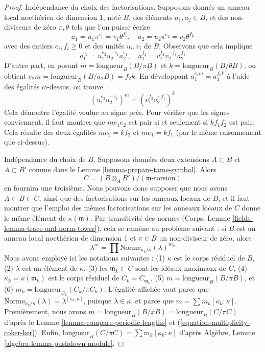 \begin{proof}
Indépendance du choix des factorisations. Supposons donnés
un anneau local noethérien de dimension $1$, noté $B$, des éléments $a_1, a_2 \in B$,
et des non-diviseurs de zéro $\pi, \theta$ tels que l'on puisse écrire
$$
a_1 = u_1 \pi^{e_1} = v_1 \theta^{f_1},\quad
a_2 = u_2 \pi^{e_2} = v_2 \theta^{f_2}
$$
avec des entiers $e_i, f_i \geq 0$ et des unités $u_i, v_i$ de $B$.
Observons que cela implique
$$
a_1^{e_2} = u_1^{e_2}u_2^{-e_1}a_2^{e_1},\quad
a_1^{f_2} = v_1^{f_2}v_2^{-f_1}a_2^{f_1}
$$
D'autre part, en posant
$m = \text{longueur}_B(B/\pi B)$ et $k = \text{longueur}_B(B/\theta B)$,
on obtient $e_2 m = \text{longueur}_B(B/a_2 B) = f_2 k$.
En développant $a_1^{e_2m} = a_1^{f_2 k}$ à l'aide des égalités ci-dessus, on trouve
$$
(u_1^{e_2}u_2^{-e_1})^m =  (v_1^{f_2}v_2^{-f_1})^k
$$
Cela démontre l'égalité voulue au signe près. Pour vérifier que les signes
conviennent, il faut montrer que $me_1e_2$ est pair si et seulement si
$kf_1f_2$ est pair. Cela résulte des deux égalités $me_2 = kf_2$ et
$me_1 = kf_1$ (par le même raisonnement que ci-dessus).

\medskip\noindent
Indépendance du choix de $B$. Supposons données deux extensions
$A \subset B$ et $A \subset B'$ comme dans le Lemme \ref{lemma-prepare-tame-symbol}.
Alors
$$
C = (B \otimes_A B')/(\mathfrak m\text{-torsion})
$$
en fournira une troisième. Nous pouvons donc supposer que nous avons
$A \subset B \subset C$, ainsi que des factorisations sur les
anneaux locaux de $B$, et il faut montrer que l'emploi
des mêmes factorisations sur les anneaux locaux de $C$
donne le même élément de $\kappa(\mathfrak m)$.
Par transitivité des normes
(Corps, Lemme \ref{fields-lemma-trace-and-norm-tower}),
cela se ramène au problème suivant :
si $B$ est un anneau local noethérien de dimension $1$
et $\pi \in B$ un non-diviseur de zéro, alors
$$
\lambda^m = \prod \text{Norme}_{\kappa_k/\kappa}(\lambda)^{m_k}
$$
Nous avons employé ici les notations suivantes :
(1) $\kappa$ est le corps résiduel de $B$,
(2) $\lambda$ est un élément de $\kappa$,
(3) les $\mathfrak m_k \subset C$ sont les idéaux maximaux de $C$,
(4) $\kappa_k = \kappa(\mathfrak m_k)$ est le corps résiduel de
$C_k = C_{\mathfrak m_k}$,
(5) $m = \text{longueur}_B(B/\pi B)$, et
(6) $m_k = \text{longueur}_{C_k}(C_k/\pi C_k)$.
L'égalité affichée vaut parce que
$\text{Norme}_{\kappa_k/\kappa}(\lambda) = \lambda^{[\kappa_k : \kappa]}$,
puisque $\lambda \in \kappa$, et parce que $m = \sum m_k[\kappa_k:\kappa]$.
Premièrement, nous avons $m = \text{longueur}_B(B/xB) = \text{longueur}_B(C/\pi C)$
d'après le Lemme \ref{lemma-compare-periodic-lengths} 
et (\ref{equation-multiplicity-coker-ker}).
Enfin, $\text{longueur}_B(C/\pi C) = \sum m_k[\kappa_k:\kappa]$
d'après Algèbre, Lemme \ref{algebra-lemma-pushdown-module}.
\end{proof}


